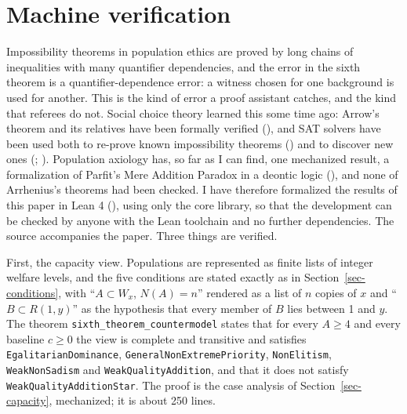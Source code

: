 \documentclass[
  11pt,
  letterpaper,
  DIV=11,
  numbers=noendperiod,
  twoside]{scrartcl}
\newcounter{none} %
\begin{document}
\section{Machine verification}\label{sec-lean}

Impossibility theorems in population ethics are proved by long chains of
inequalities with many quantifier dependencies, and the error in the
sixth theorem is a quantifier-dependence error: a witness chosen for one
background is used for another. This is the kind of error a proof
assistant catches, and the kind that referees do not. Social choice
theory learned this some time ago: Arrow's theorem and its relatives
have been formally verified (),
and SAT solvers have been used both to re-prove known impossibility
theorems () and to discover
new ones (;
). Population
axiology has, so far as I can find, one mechanized result, a
formalization of Parfit's Mere Addition Paradox in a deontic logic
(), and
none of Arrhenius's theorems had been checked. I have therefore
formalized the results of this paper in Lean 4
(), using only
the core library, so that the development can be checked by anyone with
the Lean toolchain and no further dependencies. The source accompanies
the paper. Three things are verified.

First, the capacity view. Populations are represented as finite lists of
integer welfare levels, and the five conditions are stated exactly as in
Section~\ref{sec-conditions}, with ``\(A \subset W_x\), \(N(A) = n\)''
rendered as a list of \(n\) copies of \(x\) and ``\(B \subset R(1,y)\)''
as the hypothesis that every member of \(B\) lies between 1 and \(y\).
The theorem \texttt{sixth\_theorem\_countermodel} states that for every
\(A \geq 4\) and every baseline \(c \geq 0\) the view is complete and
transitive and satisfies \texttt{EgalitarianDominance},
\texttt{GeneralNonExtremePriority}, \texttt{NonElitism},
\texttt{WeakNonSadism} and \texttt{WeakQualityAddition}, and that it
does not satisfy \texttt{WeakQualityAdditionStar}. The proof is the case
analysis of Section~\ref{sec-capacity}, mechanized; it is about 250
lines.
\end{document}
